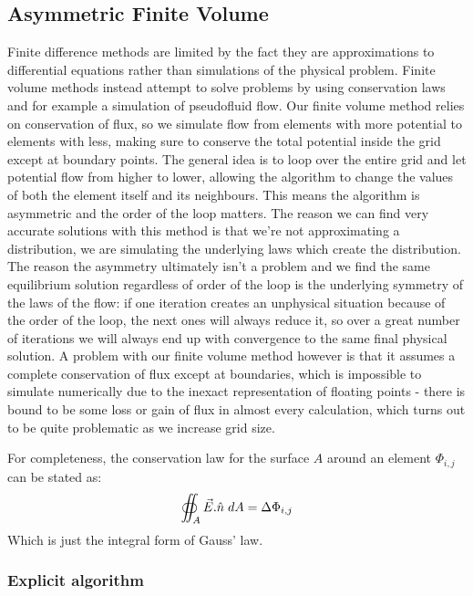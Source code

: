 \documentclass[aps,twocolumn,pre,nofootinbib,10pt]{revtex4-1}
\begin{document}
\subsection{Asymmetric Finite Volume}
Finite difference methods are limited by the fact they are approximations to differential equations rather than simulations of the physical problem. Finite volume methods instead attempt to solve problems by using conservation laws and for example a simulation of pseudofluid flow. Our finite volume method relies on conservation of flux, so we simulate flow from elements with more potential to elements with less, making sure to conserve the total potential inside the grid except at boundary points. The general idea is to loop over the entire grid and let potential flow from higher to lower, allowing the algorithm to change the values of both the element itself and its neighbours. This means the algorithm is asymmetric and the order of the loop matters. The reason we can find very accurate solutions with this method is that we're not approximating a distribution, we are simulating the underlying laws which create the distribution. The reason the asymmetry ultimately isn't a problem and we find the 
same equilibrium solution regardless of order of the loop is the underlying symmetry of the laws of the flow: if one iteration creates an unphysical situation because of the order of the loop, the next ones will always reduce it, so over a great number of iterations we will always end up with convergence to the same final physical solution. A problem with our finite volume method however is that it assumes a complete conservation of flux except at boundaries, which is impossible to simulate numerically due to the inexact representation of floating points - there is bound to be some loss or gain of flux in almost every calculation, which turns out to be quite problematic as we increase grid size.

For completeness, the conservation law for the surface $A$ around an element $\Phi_{i,j}$ can be stated as:
\begin{gather}
  \oiint_{A} \vec{E}.\hat{n} \hspace{1mm} dA = \Delta \Phi_{i,j}
  \label{conservationvol}
\end{gather}
Which is just the integral form of Gauss' law.

\subsubsection{Explicit algorithm}
\end{document}
